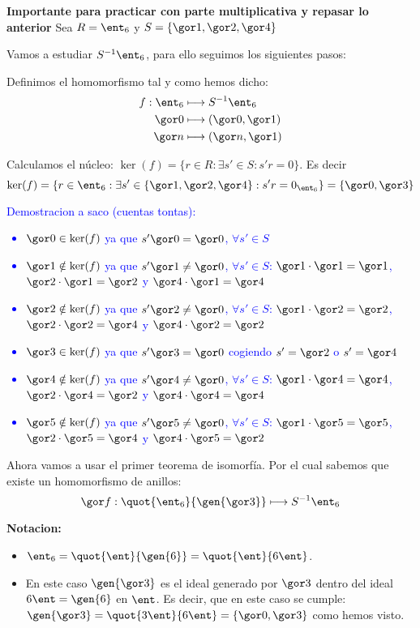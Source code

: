 \begin{example} \textbf{Importante para practicar con parte multiplicativa y repasar lo anterior}
	Sea $R = \ent_6$ y $S=\{ \cls{1}, \cls{2}, \cls{4} \}$

	Vamos a estudiar $S^{-1}\ent_6$, para ello seguimos los siguientes pasos:

	Definimos el homomorfismo tal y como hemos dicho:
	\begin{align*}
		f: \ent_6 & \longmapsto  S^{-1}\ent_6\\
		\cls{0} & \longmapsto (\cls{0},\cls{1}) \\
		\cls{n} & \longmapsto (\cls{n},\cls{1}) \\
	\end{align*}

Calculamos el núcleo: $\ker(f)=\{ r \in R: \exists s' \in S: s'r=0 \}$. Es decir
$$\ker(f) = \{ r \in \ent_6: \exists s' \in \{ \cls{1}, \cls{2}, \cls{4} \}: s'r=0_{\ent_6} \} = \{ \cls{0}, \cls{3}\}$$

\textcolor{blue}{Demostracion a saco (cuentas tontas):
	\begin{itemize}
		\item $\cls{0} \in \ker(f)$ ya que $s'\cls{0}=\cls{0}$, $\forall s' \in S$
		\item $\cls{1} \notin \ker(f)$ ya que $s'\cls{1}\neq\cls{0}$, $\forall s' \in S$: $\cls{1}\cdot\cls{1}=\cls{1}$, $\cls{2}\cdot\cls{1}=\cls{2}$ y $\cls{4}\cdot\cls{1}=\cls{4}$
		\item $\cls{2} \notin \ker(f)$ ya que $s'\cls{2}\neq\cls{0}$, $\forall s' \in S$: $\cls{1}\cdot\cls{2}=\cls{2}$, $\cls{2}\cdot\cls{2}=\cls{4}$ y $\cls{4}\cdot\cls{2}=\cls{2}$
		\item $\cls{3} \in \ker(f)$ ya que $s'\cls{3}=\cls{0}$ cogiendo $s'=\cls{2}$ o $s'=\cls{4}$
		\item $\cls{4} \notin \ker(f)$ ya que $s'\cls{4}\neq\cls{0}$, $\forall s' \in S$: $\cls{1}\cdot\cls{4}=\cls{4}$, $\cls{2}\cdot\cls{4}=\cls{2}$ y $\cls{4}\cdot\cls{4}=\cls{4}$
		\item $\cls{5} \notin \ker(f)$ ya que $s'\cls{5}\neq\cls{0}$, $\forall s' \in S$: $\cls{1}\cdot\cls{5}=\cls{5}$, $\cls{2}\cdot\cls{5}=\cls{4}$ y $\cls{4}\cdot\cls{5}=\cls{2}$
	\end{itemize}}

	Ahora vamos a usar el primer teorema de isomorfía. Por el cual sabemos que existe un homomorfismo de anillos:
	$$\cls{f}: \quot{\ent_6}{\gen{\cls{3}}} \longmapsto S^{-1}\ent_6$$

	\textbf{Notacion:}
	\begin{itemize}
		\item $\ent_6 = \quot{\ent}{\gen{6}}= \quot{\ent}{6 \ent}$.
		\item En este caso $\gen{\cls{3}}$ es el ideal generado por $\cls{3}$ dentro del ideal $6\ent=\gen{6}$ en $\ent$. Es decir, que en este caso se cumple: $\gen{\cls{3}}=\quot{3\ent}{6\ent} = \{ \cls{0}, \cls{3}\}$ como hemos visto.
	\end{itemize}


\end{example}
